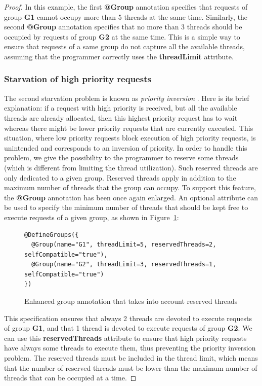 \documentclass[11pt]{report}
\begin{document}
\begin{proof}
In this example, the first \textbf{@Group} annotation specifies that requests of group \textbf{G1} cannot occupy more than 5 threads at the same time. Similarly, the second \textbf{@Group} annotation specifies that no more than 3 threads should be occupied by requests of group \textbf{G2} at the same time.
This is a simple way to ensure that requests of a same group do not capture all the available threads, assuming that the programmer correctly uses the \textbf{threadLimit} attribute.

\subsubsection{Starvation of high priority requests}
The second starvation problem is known as \emph{priority inversion} \cite{Lampson:1980:EPM:358818.358824}. Here is its brief explanation: if a request with high priority is received, but all the available threads are already allocated, then this highest priority request has to wait whereas there might be lower priority requests that are currently executed. This situation, where low priority requests block execution of high priority requests, is unintended and corresponds to an inversion of priority. In order to handle this problem, we give the possibility to the programmer to reserve some threads (which is different from limiting the thread utilization). Such reserved threads are only dedicated to a given group. Reserved threads apply in addition to the maximum number of threads that the group can occupy. To support this feature, the \textbf{@Group} annotation has been once again enlarged. An optional attribute can be used to specify the minimum number of threads that should be kept free to execute requests of a given group, as shown in Figure~\ref{fig:new_new_groups}:

\begin{figure}[!ht]
	\lstset{language=java, numbers=left, numberstyle=\tiny, stepnumber=1, numbersep=5pt, basicstyle=\footnotesize}
	\begin{lstlisting}[frame=single]
@DefineGroups({
  @Group(name="G1", threadLimit=5, reservedThreads=2, selfCompatible="true"),
  @Group(name="G2", threadLimit=3, reservedThreads=1, selfCompatible="true")
})
 	\end{lstlisting}
\caption{Enhanced group annotation that takes into account reserved threads}
\label{fig:new_new_groups}
\end{figure}

This specification ensures that always 2 threads are devoted to execute requests of group \textbf{G1}, and that 1 thread is devoted to execute requests of group \textbf{G2}. We can use this \textbf{reservedThreads} attribute to ensure that high priority requests have always some threads to execute them, thus preventing the priority inversion problem.
The reserved threads must be included in the thread limit, which means that the number of reserved threads must be lower than the maximum number of threads that can be occupied at a time.


\end{proof}
\end{document}
